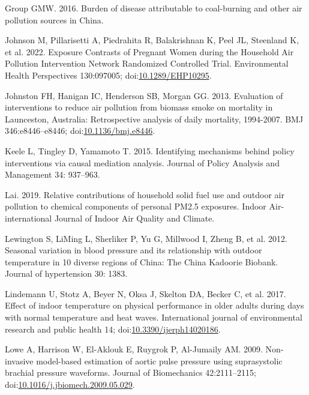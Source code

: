 \documentclass[
  letterpaper,
  DIV=11,
  numbers=noendperiod]{scrartcl}
\newlength{\cslhangindent}
\newlength{\cslentryspacingunit} %
\newenvironment{CSLReferences}[2] %
 {%
  \setlength{\parindent}{0pt}
  \ifodd #1
  \let\oldpar\par
  \def\par{\hangindent=\cslhangindent\oldpar}
  \fi
  \setlength{\parskip}{#2\cslentryspacingunit}
 }%
 {}
\begin{document}
\begin{CSLReferences}{1}{0}
\leavevmode{}%
Group GMW. 2016. Burden of disease attributable to coal-burning and
other air pollution sources in {China}.

\leavevmode{}%
Johnson M, Pillarisetti A, Piedrahita R, Balakrishnan K, Peel JL,
Steenland K, et al. 2022. Exposure {Contrasts} of {Pregnant Women}
during the {Household Air Pollution Intervention Network Randomized
Controlled Trial}. Environmental Health Perspectives 130:097005;
doi:\href{https://doi.org/10.1289/EHP10295}{10.1289/EHP10295}.

\leavevmode{}%
Johnston FH, Hanigan IC, Henderson SB, Morgan GG. 2013. Evaluation of
interventions to reduce air pollution from biomass smoke on mortality in
{Launceston}, {Australia}: Retrospective analysis of daily mortality,
1994-2007. BMJ 346:e8446--e8446;
doi:\href{https://doi.org/10.1136/bmj.e8446}{10.1136/bmj.e8446}.

\leavevmode{}%
Keele L, Tingley D, Yamamoto T. 2015. Identifying mechanisms behind
policy interventions via causal mediation analysis. Journal of Policy
Analysis and Management 34: 937--963.

\leavevmode{}%
Lai. 2019. Relative contributions of household solid fuel use and
outdoor air pollution to chemical components of personal {PM2}.5
exposures. Indoor Air-international Journal of Indoor Air Quality and
Climate.

\leavevmode{}%
Lewington S, LiMing L, Sherliker P, Yu G, Millwood I, Zheng B, et al.
2012. Seasonal variation in blood pressure and its relationship with
outdoor temperature in 10 diverse regions of {China}: The {China
Kadoorie Biobank}. Journal of hypertension 30: 1383.

\leavevmode{}%
Lindemann U, Stotz A, Beyer N, Oksa J, Skelton DA, Becker C, et al.
2017. Effect of indoor temperature on physical performance in older
adults during days with normal temperature and heat waves. International
journal of environmental research and public health 14;
doi:\href{https://doi.org/10.3390/ijerph14020186}{10.3390/ijerph14020186}.

\leavevmode{}%
Lowe A, Harrison W, El-Aklouk E, Ruygrok P, Al-Jumaily AM. 2009.
Non-invasive model-based estimation of aortic pulse pressure using
suprasystolic brachial pressure waveforms. Journal of Biomechanics
42:2111--2115;
doi:\href{https://doi.org/10.1016/j.jbiomech.2009.05.029}{10.1016/j.jbiomech.2009.05.029}.


\end{CSLReferences}
\end{document}
